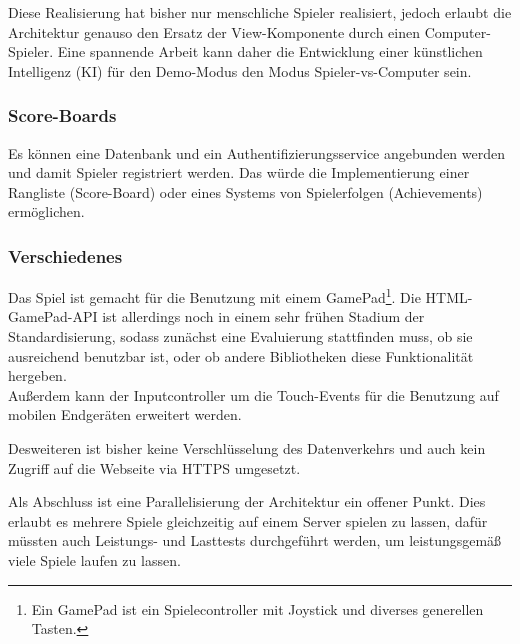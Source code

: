 Diese Realisierung hat bisher nur menschliche Spieler realisiert, jedoch erlaubt die Architektur genauso den Ersatz der View-Komponente durch einen Computer-Spieler. Eine spannende Arbeit kann daher die Entwicklung einer künstlichen Intelligenz (KI) für den Demo-Modus \bzw den Modus Spieler-vs-Computer sein.

\subsubsection{Score-Boards}

Es können eine Datenbank und ein Authentifizierungsservice angebunden werden und damit Spieler registriert werden. Das würde die Implementierung einer Rangliste (Score-Board) oder eines Systems von Spielerfolgen (Achievements) ermöglichen.

\subsubsection{Verschiedenes}

Das Spiel ist gemacht für die Benutzung mit einem GamePad\footnote{Ein GamePad ist ein Spielecontroller mit Joystick und diverses generellen Tasten.}. Die HTML-GamePad-API ist allerdings noch in einem sehr frühen Stadium der Standardisierung, sodass zunächst eine Evaluierung stattfinden muss, ob sie ausreichend benutzbar ist, oder ob andere Bibliotheken diese Funktionalität hergeben.\\
Außerdem kann der Inputcontroller um die Touch-Events für die Benutzung auf mobilen Endgeräten erweitert werden.

Desweiteren ist bisher keine Verschlüsselung des Datenverkehrs und auch kein Zugriff auf die Webseite via HTTPS umgesetzt.

Als Abschluss ist eine Parallelisierung der Architektur ein offener Punkt. Dies erlaubt es mehrere Spiele gleichzeitig auf einem Server spielen zu lassen, dafür müssten auch Leistungs- und Lasttests durchgeführt werden, um leistungsgemäß viele Spiele laufen zu lassen.